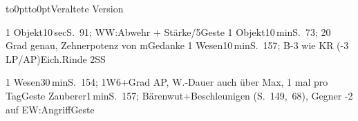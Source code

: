 \documentclass{m5figur-mv}[2018/06/10]
\begin{document}
{{{
}%

\vbox to0pt{\vspace*{17cm}\hbox to0pt{\hspace*{2cm}Veraltete Version}}


%
  {1 Objekt}{10\,sec}{S.~91; WW:Abwehr + Stärke/5}{Geste}
%
  {1 Objekt}{10\,min}{S.~73; 20 Grad genau, Zehnerpotenz von m}{Gedanke}
%
  {1 Wesen}{10\,min}{S.~157; B-3 wie KR (-3 LP/AP)}{Eich.Rinde 2SS}

%
  {1 Wesen}{30\,min}{S.~154; 1W6+Grad AP, W.-Dauer auch über Max,
  1 mal pro Tag}{Geste}
%
  {Zauberer}{1\,min}{S.~157; Bärenwut+Beschleunigen (S.~149,~68),
  Gegner -2 auf EW:Angriff}{Geste}





}}
\end{document}

